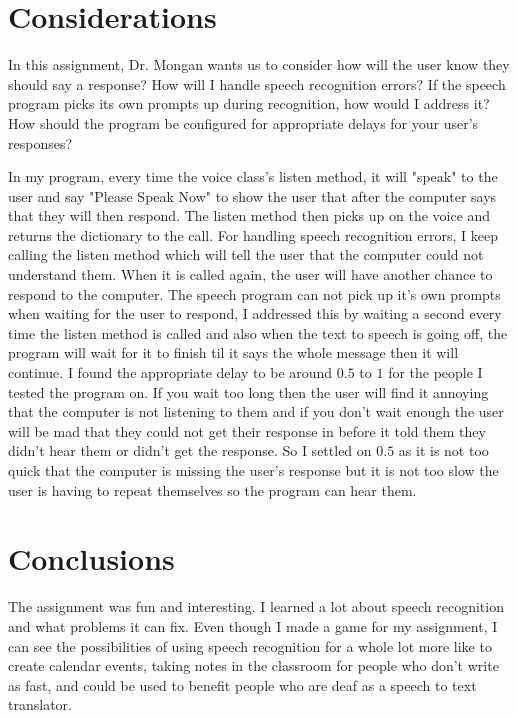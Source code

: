 \documentclass[twoside,twocolumn]{article}
\begin{document}
\section{Considerations}
In this assignment, Dr. Mongan wants us to consider how will the user know they should say a response? How will I handle speech recognition errors? If the speech program picks its own prompts up during recognition, how would I address it? How should the program be configured for appropriate delays for your user's responses?\par 
In my program, every time the voice class's listen method, it will "speak" to the user and say "Please Speak Now" to show the user that after the computer says that they will then respond. The listen method then picks up on the voice and returns the dictionary to the call. For handling speech recognition errors, I keep calling the listen method which will tell the user that the computer could not understand them. When it is called again, the user will have another chance to respond to the computer. The speech program can not pick up it's own prompts when waiting for the user to respond, I addressed this by waiting a second every time the listen method is called and also when the text to speech is going off, the program will wait for it to finish til it says the whole message then it will continue. I found the appropriate delay to be around $0.5$ to $1$ for the people I tested the program on. If you wait too long then the user will find it annoying that the computer is not listening to them and if you don't wait enough the user will be mad that they could not get their response in before it told them they didn't hear them or didn't get the response. So I settled on $0.5$ as it is not too quick that the computer is missing the user's response but it is not too slow the user is having to repeat themselves so the program can hear them.

\section{Conclusions}
The assignment was fun and interesting. I learned a lot about speech recognition and what problems it can fix. Even though I made a game for my assignment, I can see the possibilities of using speech recognition for a whole lot more like to create calendar events, taking notes in the classroom for people who don't write as fast, and could be used to benefit people who are deaf as a speech to text translator. 


\printbibliography %

\end{document}
